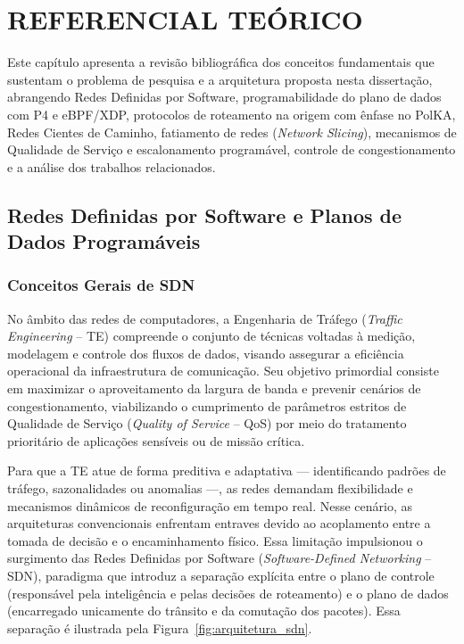 \chapter{REFERENCIAL TEÓRICO}
\label{chap:referencialTeorico}

Este capítulo apresenta a revisão bibliográfica dos conceitos fundamentais que sustentam o problema de pesquisa e a arquitetura proposta nesta dissertação, abrangendo Redes Definidas por Software, programabilidade do plano de dados com P4 e eBPF/XDP, protocolos de roteamento na origem com ênfase no PolKA, Redes Cientes de Caminho, fatiamento de redes (\textit{Network Slicing}), mecanismos de Qualidade de Serviço e escalonamento programável, controle de congestionamento e a análise dos trabalhos relacionados.

\section{Redes Definidas por Software e Planos de Dados Programáveis}
\label{sec:sdn_programabilidade}

\subsection{Conceitos Gerais de SDN}
\label{subsec:conceitos_sdn}

No âmbito das redes de computadores, a Engenharia de Tráfego (\textit{Traffic Engineering} -- TE) compreende o conjunto de técnicas voltadas à medição, modelagem e controle dos fluxos de dados, visando assegurar a eficiência operacional da infraestrutura de comunicação. Seu objetivo primordial consiste em maximizar o aproveitamento da largura de banda e prevenir cenários de congestionamento, viabilizando o cumprimento de parâmetros estritos de Qualidade de Serviço (\textit{Quality of Service} -- QoS) por meio do tratamento prioritário de aplicações sensíveis ou de missão crítica.

Para que a TE atue de forma preditiva e adaptativa --- identificando padrões de tráfego, sazonalidades ou anomalias ---, as redes demandam flexibilidade e mecanismos dinâmicos de reconfiguração em tempo real. Nesse cenário, as arquiteturas convencionais enfrentam entraves devido ao acoplamento entre a tomada de decisão e o encaminhamento físico. Essa limitação impulsionou o surgimento das Redes Definidas por Software (\textit{Software-Defined Networking} -- SDN), paradigma que introduz a separação explícita entre o plano de controle (responsável pela inteligência e pelas decisões de roteamento) e o plano de dados (encarregado unicamente do trânsito e da comutação dos pacotes). Essa separação é ilustrada pela Figura~\ref{fig:arquitetura_sdn}.

